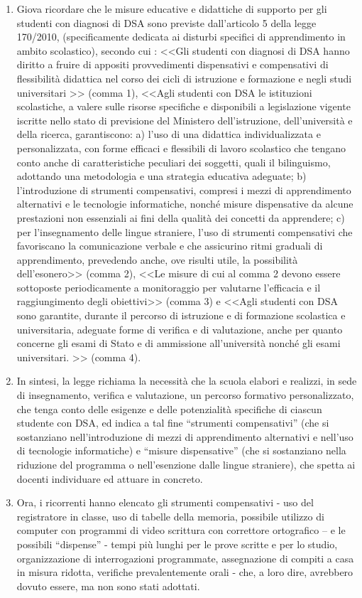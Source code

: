 \begin{enumerate}
	\item Giova ricordare che le misure educative e didattiche di supporto per gli studenti con diagnosi di DSA sono previste dall'articolo 5 della legge 170/2010, (specificamente dedicata ai disturbi specifici di apprendimento in ambito scolastico), secondo cui : <<Gli studenti con diagnosi di DSA hanno diritto a fruire di appositi provvedimenti dispensativi e compensativi di flessibilità didattica nel corso dei cicli di istruzione e formazione e negli studi universitari >> (comma 1), <<Agli studenti con DSA le istituzioni scolastiche, a valere sulle risorse specifiche e disponibili a legislazione vigente iscritte nello stato di previsione del Ministero dell'istruzione, dell'università e della ricerca, garantiscono: a) l’uso di una didattica individualizzata e personalizzata, con forme efficaci e flessibili di lavoro scolastico che tengano conto anche di caratteristiche peculiari dei soggetti, quali il bilinguismo, adottando una metodologia e una strategia educativa adeguate; b) l'introduzione di strumenti compensativi, compresi i mezzi di apprendimento alternativi e le tecnologie informatiche, nonché misure dispensative da alcune prestazioni non essenziali ai fini della qualità dei concetti da apprendere; c) per l'insegnamento delle lingue straniere, l’uso di strumenti compensativi che favoriscano la comunicazione verbale e che assicurino ritmi graduali di apprendimento, prevedendo anche, ove risulti utile, la possibilità dell'esonero>> (comma 2), <<Le misure di cui al comma 2 devono essere sottoposte periodicamente a monitoraggio per valutarne l'efficacia e il raggiungimento degli obiettivi>> (comma 3) e <<Agli studenti con DSA sono garantite, durante il percorso di istruzione e di formazione scolastica e universitaria, adeguate forme di verifica e di valutazione, anche per quanto concerne gli esami di Stato e di ammissione all'università nonché gli esami universitari. >> (comma 4).
	\item In sintesi, la legge richiama la necessità che la scuola elabori e realizzi, in sede di insegnamento, verifica e valutazione, un percorso formativo personalizzato, che tenga conto delle esigenze e delle potenzialità specifiche di ciascun studente con DSA, ed indica a tal fine “strumenti compensativi” (che si sostanziano nell'introduzione di mezzi di apprendimento alternativi e nell’uso di tecnologie informatiche) e “misure dispensative” (che si sostanziano nella riduzione del programma o nell'esenzione dalle lingue straniere), che spetta ai docenti individuare ed attuare in concreto.
	\item Ora, i ricorrenti hanno elencato gli strumenti compensativi - uso del registratore in classe, uso di tabelle della memoria, possibile utilizzo di computer con programmi di video scrittura con correttore ortografico – e le possibili “dispense” - tempi più lunghi per le prove scritte e per lo studio, organizzazione di interrogazioni programmate, assegnazione di compiti a casa in misura ridotta, verifiche prevalentemente orali - che, a loro dire, avrebbero dovuto essere, ma non sono stati adottati.

\end{enumerate}
